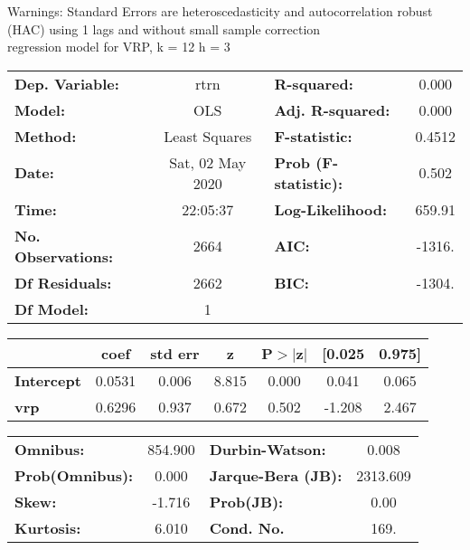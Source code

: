 Warnings: \newline
 [1] Standard Errors are heteroscedasticity and autocorrelation robust (HAC) using 1 lags and without small sample correction\\ 

regression model for VRP, k = 12 h = 3\begin{center}
\begin{tabular}{lclc}
\toprule
\textbf{Dep. Variable:}    &       rtrn       & \textbf{  R-squared:         } &     0.000   \\
\textbf{Model:}            &       OLS        & \textbf{  Adj. R-squared:    } &     0.000   \\
\textbf{Method:}           &  Least Squares   & \textbf{  F-statistic:       } &    0.4512   \\
\textbf{Date:}             & Sat, 02 May 2020 & \textbf{  Prob (F-statistic):} &    0.502    \\
\textbf{Time:}             &     22:05:37     & \textbf{  Log-Likelihood:    } &    659.91   \\
\textbf{No. Observations:} &        2664      & \textbf{  AIC:               } &    -1316.   \\
\textbf{Df Residuals:}     &        2662      & \textbf{  BIC:               } &    -1304.   \\
\textbf{Df Model:}         &           1      & \textbf{                     } &             \\
\bottomrule
\end{tabular}
\begin{tabular}{lcccccc}
                   & \textbf{coef} & \textbf{std err} & \textbf{z} & \textbf{P$> |$z$|$} & \textbf{[0.025} & \textbf{0.975]}  \\
\midrule
\textbf{Intercept} &       0.0531  &        0.006     &     8.815  &         0.000        &        0.041    &        0.065     \\
\textbf{vrp}       &       0.6296  &        0.937     &     0.672  &         0.502        &       -1.208    &        2.467     \\
\bottomrule
\end{tabular}
\begin{tabular}{lclc}
\textbf{Omnibus:}       & 854.900 & \textbf{  Durbin-Watson:     } &    0.008  \\
\textbf{Prob(Omnibus):} &   0.000 & \textbf{  Jarque-Bera (JB):  } & 2313.609  \\
\textbf{Skew:}          &  -1.716 & \textbf{  Prob(JB):          } &     0.00  \\
\textbf{Kurtosis:}      &   6.010 & \textbf{  Cond. No.          } &     169.  \\
\bottomrule
\end{tabular}
\end{center}

